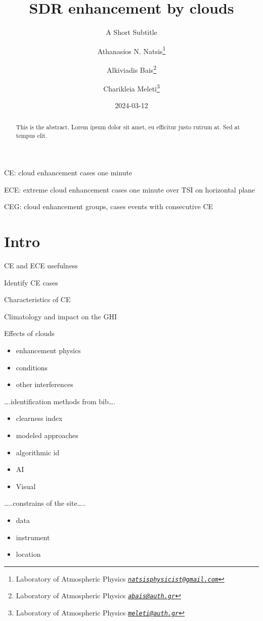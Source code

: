 \documentclass[
]{article}
\title{SDR enhancement by clouds}
\subtitle{A Short Subtitle}
\author{Athanasios N. Natsis\footnote{Laboratory of Atmospheric Physics \emph{\href{mailto:natsisphysicist@gmail.com}{\nolinkurl{natsisphysicist@gmail.com}}}} \and Alkiviadis Bais\footnote{Laboratory of Atmospheric Physics \emph{\href{mailto:abais@auth.gr}{\nolinkurl{abais@auth.gr}}}} \and Charikleia Meleti\footnote{Laboratory of Atmospheric Physics \emph{\href{mailto:meleti@auth.gr}{\nolinkurl{meleti@auth.gr}}}}}
\date{2024-03-12}
\providecommand{\tightlist}{%
  \setlength{\itemsep}{0pt}\setlength{\parskip}{0pt}}
\begin{document}
\maketitle
\begin{abstract}
This is the abstract. Lorem ipsum dolor sit amet, eu efficitur justo rutrum at. Sed at tempus elit.
\end{abstract}

{
\setcounter{tocdepth}{4}
\tableofcontents
}
CE: cloud enhancement cases one minute

ECE: extreme cloud enhancement cases one minute over TSI on horizontal plane

CEG: cloud enhancement groups, cases events with consecutive CE

\hypertarget{intro}{%
\section{Intro}\label{intro}}

CE and ECE usefulness

Identify CE cases

Characteristics of CE

Climatology and impact on the GHI

Effects of clouds

\begin{itemize}
\tightlist
\item
  enhancement physics
\item
  conditions
\item
  other interferences
\end{itemize}

\ldots.identification methods from bib\ldots.

\begin{itemize}
\tightlist
\item
  clearness index
\item
  modeled approaches
\item
  algorithmic id
\item
  AI
\item
  Visual
\end{itemize}

\ldots..constrains of the site\ldots..

\begin{itemize}
\tightlist
\item
  data
\item
  instrument
\item
  location
\end{itemize}
\end{document}
